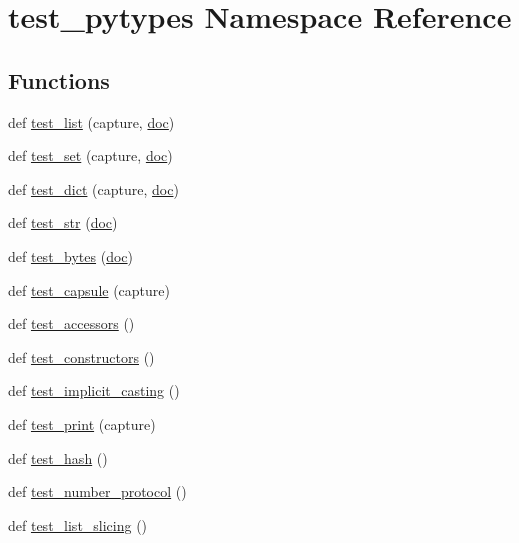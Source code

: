 \hypertarget{namespacetest__pytypes}{}\section{test\+\_\+pytypes Namespace Reference}
\label{namespacetest__pytypes}
\subsection*{Functions}
\begin{DoxyCompactItemize}
\item 
def \mbox{\hyperlink{namespacetest__pytypes_a864bb5562ada50f255b896f1136134ab}{test\+\_\+list}} (capture, \mbox{\hyperlink{structdoc}{doc}})
\item 
def \mbox{\hyperlink{namespacetest__pytypes_a275489a7e1230aea800129fc3ffdde15}{test\+\_\+set}} (capture, \mbox{\hyperlink{structdoc}{doc}})
\item 
def \mbox{\hyperlink{namespacetest__pytypes_af2c632263da5634154f5189f49d0d7b1}{test\+\_\+dict}} (capture, \mbox{\hyperlink{structdoc}{doc}})
\item 
def \mbox{\hyperlink{namespacetest__pytypes_ad6d2ad05b3a87707742ead1e495ff1f3}{test\+\_\+str}} (\mbox{\hyperlink{structdoc}{doc}})
\item 
def \mbox{\hyperlink{namespacetest__pytypes_a3ed975f2b5bdccc7e1d27029b2546d04}{test\+\_\+bytes}} (\mbox{\hyperlink{structdoc}{doc}})
\item 
def \mbox{\hyperlink{namespacetest__pytypes_ad1c7208937b2181294ac18a5c499e20f}{test\+\_\+capsule}} (capture)
\item 
def \mbox{\hyperlink{namespacetest__pytypes_a974fda8fd61d3e2048c63f9e0d3a83f1}{test\+\_\+accessors}} ()
\item 
def \mbox{\hyperlink{namespacetest__pytypes_a4ff282c351b11d4c79ff35f5d8fe185f}{test\+\_\+constructors}} ()
\item 
def \mbox{\hyperlink{namespacetest__pytypes_afccf1dacce1c791b934f316c40c1cba8}{test\+\_\+implicit\+\_\+casting}} ()
\item 
def \mbox{\hyperlink{namespacetest__pytypes_a33f1f3b053db11d14920b4cc2104452e}{test\+\_\+print}} (capture)
\item 
def \mbox{\hyperlink{namespacetest__pytypes_ab2f940d501d74edecb6abb21290bff98}{test\+\_\+hash}} ()
\item 
def \mbox{\hyperlink{namespacetest__pytypes_a37198618529e1a4245bc93947e2e6a54}{test\+\_\+number\+\_\+protocol}} ()
\item 
def \mbox{\hyperlink{namespacetest__pytypes_a9fa1200e2b889b4db79ab546967641ab}{test\+\_\+list\+\_\+slicing}} ()
\end{DoxyCompactItemize}
